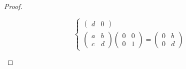 \begin{proof}
\begin{enumerate}[label = (\alph*)]
\[\begin{cases}
\begin{pmatrix}
                          d & 0
                      \end{pmatrix} \\
                      \begin{pmatrix}
                          a & b \\
                          c & d
                      \end{pmatrix}
                      \begin{pmatrix}
                          0 & 0 \\
                          0 & 1
                      \end{pmatrix}=
                      \begin{pmatrix}
                          0 & b \\
                          0 & d
                      \end{pmatrix}
                  \end{cases}
              \]
              

\end{enumerate}
\end{proof}
